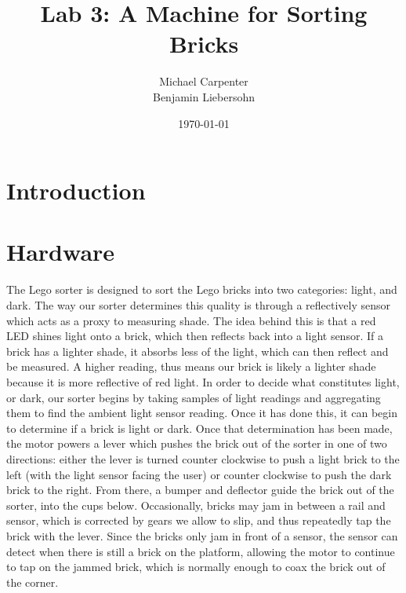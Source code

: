 \documentclass{article}
\title{Lab 3: A Machine for Sorting Bricks}
\author{Michael Carpenter \\ Benjamin Liebersohn}
\date{\today}
\begin{document}
\maketitle

\section{Introduction}

\section{Hardware}
The Lego sorter is designed to sort the Lego bricks into two categories: light, and dark.
The way our sorter determines this quality is through a reflectively sensor which acts as a proxy to measuring shade.
The idea behind this is that a red LED shines light onto a brick, which then reflects back into a light sensor.
If a brick has a lighter shade, it absorbs less of the light, which can then reflect and be measured.
A higher reading, thus means our brick is likely a lighter shade because it is more reflective of red light.
In order to decide what constitutes light, or dark, our sorter begins by taking samples of light readings and aggregating them to find the ambient light sensor reading.
Once it has done this, it can begin to determine if a brick is light or dark. 
Once that determination has been made, the motor powers a lever which pushes the brick out of the sorter in one of two directions: either the lever is turned counter clockwise to push a light brick to the left (with the light sensor facing the user) or counter clockwise to push the dark brick to the right.
From there, a bumper and deflector guide the brick out of the sorter, into the cups below.
Occasionally, bricks may jam in between a rail and sensor, which is corrected by gears we allow to slip, and thus repeatedly tap the brick with the lever. 
Since the bricks only jam in front of a sensor, the sensor can detect when there is still a brick on the platform, allowing the motor to continue to tap on the jammed brick, which is normally enough to coax the brick out of the corner.
\end{document}
